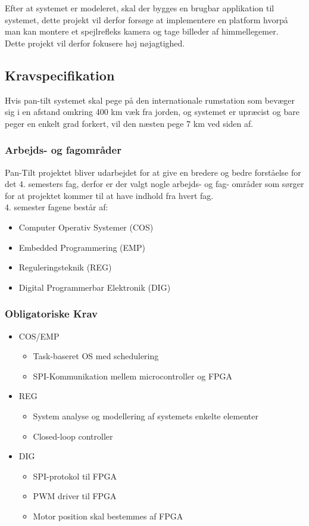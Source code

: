 Efter at systemet er modeleret, skal der bygges en brugbar applikation til systemet, dette projekt vil derfor forsøge at implementere en platform hvorpå man kan montere et spejlrefleks kamera og tage billeder af himmellegemer.\\
Dette projekt vil derfor fokusere høj nøjagtighed.\\

\subsection{Kravspecifikation}

Hvis pan-tilt systemet skal pege på den internationale rumstation som bevæger sig i en afstand omkring 400 km væk fra jorden, og systemet er upræcist og bare peger en enkelt grad forkert, vil den næsten pege 7 km ved siden af.

\subsubsection{Arbejds- og fagområder}
Pan-Tilt projektet bliver udarbejdet for at give en bredere og bedre forståelse for det 4. semesters fag, derfor er der valgt nogle arbejds- og fag- områder som sørger for at projektet kommer til at have indhold fra hvert fag.\\
4. semester fagene består af:
\begin{itemize}[noitemsep]
	\item Computer Operativ Systemer (COS)
	\item Embedded Programmering (EMP)
	\item Reguleringsteknik (REG)
	\item Digital Programmerbar Elektronik (DIG)
\end{itemize}

\subsubsection{Obligatoriske Krav}

\begin{itemize}[noitemsep]
	\item COS/EMP
	\begin{itemize}[noitemsep]
		\item Task-baseret OS med schedulering
		\item SPI-Kommunikation mellem microcontroller og FPGA
	\end{itemize}
	\item REG
	\begin{itemize}[noitemsep]
		\item System analyse og modellering af systemets enkelte elementer
		\item Closed-loop controller
	\end{itemize}
	\item DIG
	\begin{itemize}[noitemsep]
		\item SPI-protokol til FPGA
		\item PWM driver til FPGA
		\item Motor position skal bestemmes af FPGA
	\end{itemize}
\end{itemize}

